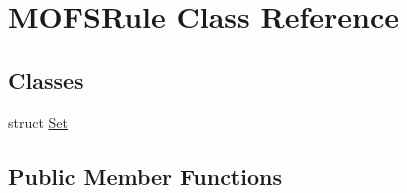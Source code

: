 \hypertarget{classMOFSRule}{\section{M\-O\-F\-S\-Rule Class Reference}
\label{classMOFSRule}
}
\subsection*{Classes}
\begin{DoxyCompactItemize}
\item 
struct \hyperlink{structMOFSRule_1_1Set}{Set}
\end{DoxyCompactItemize}
\subsection*{Public Member Functions}
